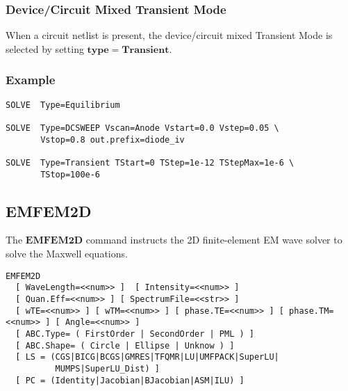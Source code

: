 \documentclass[oneside,12pt]{cgd_book}
\begin{document}
\subsubsection{Device/Circuit Mixed Transient Mode}
When a circuit netlist is present, the device/circuit mixed Transient Mode is selected by setting
$\mathbf{type=Transient}$.
\par
\subsubsection{Example}
\begin{lstlisting}[style=GeniusCode]
SOLVE  Type=Equilibrium

SOLVE  Type=DCSWEEP Vscan=Anode Vstart=0.0 Vstep=0.05 \
       Vstop=0.8 out.prefix=diode_iv

SOLVE  Type=Transient TStart=0 TStep=1e-12 TStepMax=1e-6 \
       TStop=100e-6
\end{lstlisting}
\subsection{EMFEM2D}
The $\mathbf{EMFEM2D}$
command instructs the 2D finite-element EM wave solver to solve the
        Maxwell equations.
\par
\begin{lstlisting}[style=GeniusCmd]
EMFEM2D
  [ WaveLength=<<num>> ]  [ Intensity=<<num>> ]
  [ Quan.Eff=<<num>> ] [ SpectrumFile=<<str>> ]
  [ wTE=<<num>> ] [ wTM=<<num>> ] [ phase.TE=<<num>> ] [ phase.TM=<<num>> ] [ Angle=<<num>> ]
  [ ABC.Type= ( FirstOrder | SecondOrder | PML ) ]
  [ ABC.Shape= ( Circle | Ellipse | Unknow ) ]
  [ LS = (CGS|BICG|BCGS|GMRES|TFQMR|LU|UMFPACK|SuperLU|
          MUMPS|SuperLU_Dist) ]
  [ PC = (Identity|Jacobian|BJacobian|ASM|ILU) ]
\end{lstlisting}
\par
\end{document}
